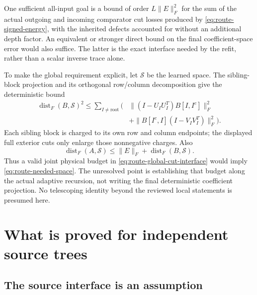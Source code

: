 \documentclass[11pt,oneside,openany,a4paper]{report}
\numberwithin{equation}{chapter}
\theoremstyle{definition}
\theoremstyle{remark}
\begin{document}
One sufficient all-input goal is a bound of order
$L\lVert E\rVert_F^2$ for the sum of the actual outgoing and incoming
comparator cut losses produced by \eqref{eq:route-signed-energy}, with
the inherited defects accounted for without an additional depth
factor.  An equivalent or stronger direct bound on the final
coefficient-space error would also suffice.  The latter is the exact
interface needed by the refit, rather than a scalar inverse trace alone.

To make the global requirement explicit, let $\mathcal S$ be the learned
space.  The sibling-block projection and its orthogonal row/column
decomposition give the deterministic bound
\begin{align}
 \operatorname{dist}_F(B,\mathcal S)^2
 \leq\sum_{I\ne\mathrm{root}}\bigl(&
 \lVert(I-U_IU_I^T)B[I,I^c]\rVert_F^2\nonumber\\[-2pt]
 &+\lVert B[I^c,I](I-V_IV_I^T)\rVert_F^2\bigr).
 \label{eq:route-global-cut-interface}
\end{align}
Each sibling block is charged to its own row and column endpoints;
the displayed full exterior cuts only enlarge those nonnegative
charges.  Also
\[
 \operatorname{dist}_F(A,\mathcal S)
 \leq\lVert E\rVert_F+\operatorname{dist}_F(B,\mathcal S).
\]
Thus a valid joint physical budget in
\eqref{eq:route-global-cut-interface} would imply
\eqref{eq:route-needed-space}.  The unresolved point is establishing
that budget along the actual adaptive recursion, not writing the final
deterministic coefficient projection.  No telescoping identity beyond
the reviewed local statements is presumed here.

\chapter{What is proved for independent source trees}
\label{chap:route-sources}

\section{The source interface is an assumption}
\end{document}
